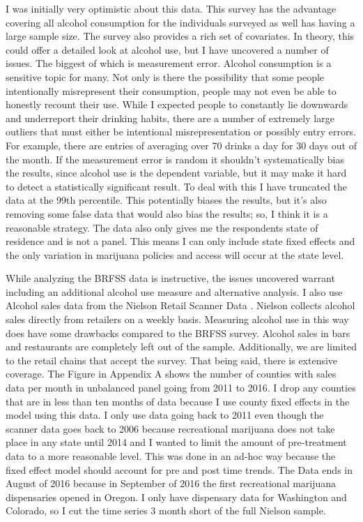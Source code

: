 \documentclass[11pt]{article}
\begin{document}
I was initially very optimistic about this data. This survey has the advantage covering all alcohol consumption for the individuals surveyed as well has having a large sample size. The survey also provides a rich set of covariates. In theory, this could offer a detailed look at alcohol use, but I have uncovered a number of issues. The biggest of which is measurement error. Alcohol consumption is a sensitive topic for many. Not only is there the possibility that some people intentionally misrepresent their consumption, people may not even be able to honestly recount their use. While I expected people to constantly lie downwards and underreport their drinking habits, there are a number of extremely large outliers that must either be intentional misrepresentation or possibly entry errors. For example, there are entries of averaging over 70 drinks a day for 30 days out of the month. If the measurement error is random it shouldn't systematically bias the results, since alcohol use is the dependent variable, but it may make it hard to detect a statistically significant result. To deal with this I have truncated the data at the 99th percentile. This potentially biases the results, but it's also removing some false data that would also bias the results; so, I think it is a reasonable strategy. The data also only gives me the respondents state of residence and is not a panel. This means I can only include state fixed effects and the only variation in marijuana policies and access will occur at the state level. \par

While analyzing the BRFSS data is instructive, the issues uncovered warrant including an additional alcohol use measure and alternative analysis.  I also use Alcohol sales data from the Nielson Retail Scanner Data . Nielson collects alcohol sales directly from retailers on a weekly basis. Measuring alcohol use in this way does have some drawbacks compared to the BRFSS survey. Alcohol sales in bars and restaurants are completely left out of the sample. Additionally, we are limited to the retail chains that accept the survey. That being said, there is extensive coverage. The Figure in Appendix A shows the number of counties with sales data per month in unbalanced panel going from 2011 to 2016. I drop any counties that are in less than ten months of data because I use county fixed effects in the model using this data. I only use data going back to 2011 even though the scanner data goes back to 2006 because recreational marijuana does not take place in any state until 2014 and I wanted to limit the amount of pre-treatment data to a more reasonable level. This was done in an ad-hoc way because the fixed effect model should account for pre and post time trends. The Data ends in August of 2016 because in September of 2016 the first recreational marijuana dispensaries opened in Oregon. I only have dispensary data for Washington and Colorado, so I cut the time series 3 month short of the full Nielson sample. \par
\end{document}
